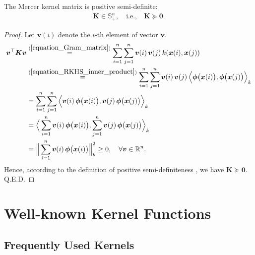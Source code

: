 \documentclass[lang=cn,10pt]{gorgeousnbook}
\numberwithin{equation}{section}%
\numberwithin{figure}{section}%
\begin{document}
\begin{lemma}\label{lemma_kernel_is_positive_semidefinite}
The Mercer kernel matrix is positive semi-definite:
\begin{align}
\boldsymbol{K} \in \mathbb{S}_{+}^n, \quad \text{i.e.,} \quad \boldsymbol{K} \succeq \boldsymbol{0}.
\end{align}
\end{lemma}
\begin{proof}
Let $\boldsymbol{v}(i)$ denote the $i$-th element of vector $\boldsymbol{v}$.
\begin{align*}
\boldsymbol{v}^\top \boldsymbol{K} \boldsymbol{v} &\overset{(\ref{equation_Gram_matrix})}{=} \sum_{i=1}^n \sum_{j=1}^n \boldsymbol{v}(i)\, \boldsymbol{v}(j)\, k(\boldsymbol{x}(i), \boldsymbol{x}(j)) \\
&\overset{(\ref{equation_RKHS_inner_product})}{=} \sum_{i=1}^n \sum_{j=1}^n \boldsymbol{v}(i)\, \boldsymbol{v}(j)\, \Big\langle \boldsymbol{\phi}\big(\boldsymbol{x}(i)\big), \boldsymbol{\phi}\big(\boldsymbol{x}(j)\big) \Big\rangle_k \\
&= \sum_{i=1}^n \sum_{j=1}^n \Big\langle \boldsymbol{v}(i)\, \boldsymbol{\phi}\big(\boldsymbol{x}(i)\big), \boldsymbol{v}(j)\, \boldsymbol{\phi}\big(\boldsymbol{x}(j)\big) \Big\rangle_k \\
&= \Big\langle \sum_{i=1}^n \boldsymbol{v}(i)\, \boldsymbol{\phi}\big(\boldsymbol{x}(i)\big), \sum_{j=1}^n \boldsymbol{v}(j)\, \boldsymbol{\phi}\big(\boldsymbol{x}(j)\big) \Big\rangle_k \\
&= \Big\| \sum_{i=1}^n \boldsymbol{v}(i)\, \boldsymbol{\phi}\big(\boldsymbol{x}(i)\big) \Big\|_k^2 \geq 0, \quad \forall \boldsymbol{v} \in \mathbb{R}^n. 
\end{align*}
Hence, according to the definition of positive semi-definiteness \cite{bhatia2009positive}, we have $\boldsymbol{K} \succeq \boldsymbol{0}$. Q.E.D.
\end{proof}


\section{Well-known Kernel Functions}\label{section_well_known_kernels}

\subsection{Frequently Used Kernels}
\end{document}

